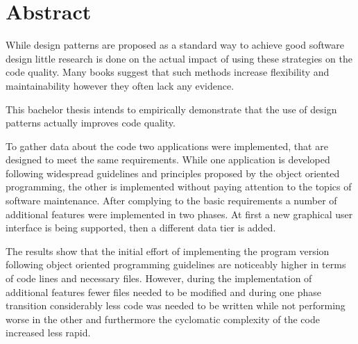 \chapter{Abstract}

While design patterns are proposed as a standard way to achieve good software design little research is done on the actual impact of using these strategies on the code quality. Many books suggest that such methods increase flexibility and maintainability however they often lack any evidence. 

This bachelor thesis intends to empirically demonstrate that the use of design patterns actually improves code quality. 

To gather data about the code two applications were implemented, that are designed to meet the same requirements. While one application is developed following widespread guidelines and principles proposed by the object oriented programming, the other is implemented without paying attention to the topics of software maintenance. After complying to the basic requirements a number of additional features were implemented in two phases. At first a new graphical user interface is being supported, then a different data tier is added.

The results show that the initial effort of implementing the program version following object oriented programming guidelines are noticeably higher in terms of code lines and necessary files. However, during the implementation of additional features fewer files needed to be modified and during one phase transition considerably less code was needed to be written while not performing worse in the other and furthermore the cyclomatic complexity of the code increased less rapid.
